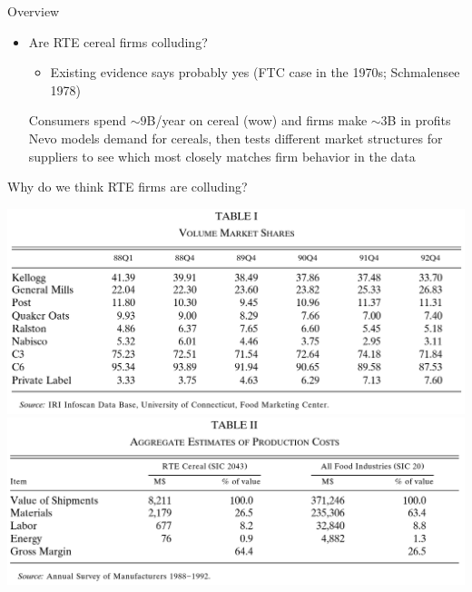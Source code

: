 \documentclass[dvipsnames]{beamer}
\begin{document}
\begin{frame}{Overview}
  \begin{itemize}
  \item Are RTE cereal firms colluding?
    \begin{itemize}
    \item Existing evidence says probably yes (FTC case in the 1970s; Schmalensee 1978)
    \end{itemize}
    \vitem Consumers spend $\sim 9$B/year on cereal (wow) and firms make $\sim 3$B in profits 
\vitem Nevo models demand for cereals, then tests different market structures for suppliers to see which most closely matches firm behavior in the data
  \end{itemize}
\end{frame}
%
\begin{frame}{Why do we think RTE firms are colluding?}
  \begin{center}
 \includegraphics[width=.8\textwidth, keepaspectratio=true]{tab1.png} 
 \\
 \includegraphics[width=.8\textwidth, keepaspectratio=true]{tab2.png} 
 \end{center}
\end{frame}
\end{document}
